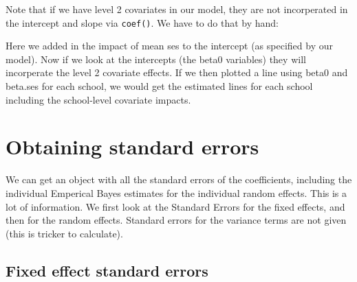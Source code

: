\documentclass[
  letterpaper,
  DIV=11,
  numbers=noendperiod]{scrreprt}
\newenvironment{Shaded}{\begin{snugshade}}{\end{snugshade}}
\newcommand{\AttributeTok}[1]{\textcolor[rgb]{0.49,0.56,0.16}{#1}}
\newcommand{\ConstantTok}[1]{\textcolor[rgb]{0.53,0.00,0.00}{#1}}
\newcommand{\FunctionTok}[1]{\textcolor[rgb]{0.02,0.16,0.49}{#1}}
\newcommand{\NormalTok}[1]{\textcolor[rgb]{0.00,0.44,0.13}{#1}}
\newcommand{\OtherTok}[1]{\textcolor[rgb]{0.00,0.44,0.13}{#1}}
\newcommand{\SpecialCharTok}[1]{\textcolor[rgb]{0.25,0.44,0.63}{#1}}
\newcommand{\StringTok}[1]{\textcolor[rgb]{0.25,0.44,0.63}{#1}}
\begin{document}
Note that if we have level 2 covariates in our model, they are not
incorperated in the intercept and slope via \texttt{coef()}. We have to
do that by hand:

\begin{Shaded}
\end{Shaded}

Here we added in the impact of mean ses to the intercept (as specified
by our model). Now if we look at the intercepts (the beta0 variables)
they will incorperate the level 2 covariate effects. If we then plotted
a line using beta0 and beta.ses for each school, we would get the
estimated lines for each school including the school-level covariate
impacts.

\hypertarget{obtaining-standard-errors}{%
\section{Obtaining standard errors}\label{obtaining-standard-errors}}

We can get an object with all the standard errors of the coefficients,
including the individual Emperical Bayes estimates for the individual
random effects. This is a lot of information. We first look at the
Standard Errors for the fixed effects, and then for the random effects.
Standard errors for the variance terms are not given (this is tricker to
calculate).

\hypertarget{fixed-effect-standard-errors}{%
\subsection{Fixed effect standard
errors}\label{fixed-effect-standard-errors}}
\end{document}
